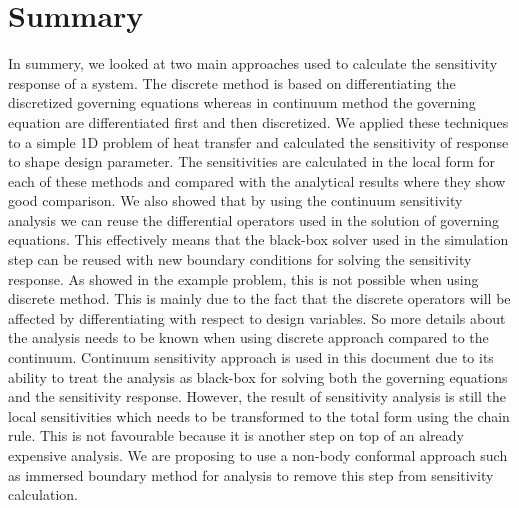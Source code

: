 \section{Summary}
In summery, we looked at two main approaches used to calculate the sensitivity response of a system. The discrete method is based on differentiating the discretized governing equations whereas in continuum method the governing equation are differentiated first and then discretized. We applied these techniques to a simple 1D problem of heat transfer and calculated the sensitivity of response to shape design parameter. The sensitivities are calculated in the local form for each of these methods and compared with the analytical results where they show good comparison. We also showed that by using the continuum sensitivity analysis we can reuse the differential operators used in the solution of governing equations. This effectively means that the black-box solver used in the simulation step can be reused with new boundary conditions for solving the sensitivity response. As showed in the example problem, this is not possible when using discrete method. This is mainly due to the fact that the discrete operators will be affected by differentiating with respect to design variables. So more details about the analysis needs to be known when using discrete approach compared to the continuum. Continuum sensitivity approach is used in this document due to its ability to treat the analysis as black-box for solving both the governing equations and the sensitivity response. However, the result of sensitivity analysis is still the local sensitivities which needs to be transformed to the total form using the chain rule. This is not favourable because it is another step on top of an already expensive analysis. We are proposing to use a non-body conformal approach such as immersed boundary method for analysis to remove this step from sensitivity calculation.